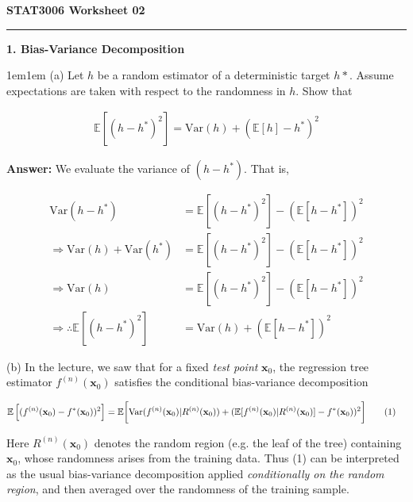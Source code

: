 \documentclass[11pt]{article}
\newcommand\numberthis{\addtocounter{equation}{1}\tag{\theequation}}
\begin{document}
    \begin{center}
        \Large \textbf{STAT3006 Worksheet 02}
    \end{center}

    \rule{\textwidth}{0.3pt}

    \large \textbf{1. Bias-Variance Decomposition}

    \begin{adjustwidth}{1em}{1em}
        (a) Let $h$ be a random estimator of a deterministic target $h*$. Assume expectations are 
        taken with respect to the randomness in $h$. Show that 

        \begin{align*}
            \mathbb{E}[(h - h^*)^2] = \text{Var}(h) + (\mathbb{E}[h] - h^*)^2
        \end{align*}

        \textbf{Answer:} We evaluate the variance of $(h - h^*)$. That is, 

        \begin{align*}
            \text{Var}(h - h^*) &= \mathbb{E}[(h - h^*)^2] - (\mathbb{E}[h - h^*])^2 \\ 
            \Rightarrow \text{Var}(h) + \text{Var}(h^*) &= \mathbb{E}[(h - h^*)^2] - 
            (\mathbb{E}[h - h^*])^2 \\ 
            \Rightarrow \text{Var}(h) &= \mathbb{E}[(h - h^*)^2] - (\mathbb{E}[h - h^*])^2 \\ 
            \Rightarrow \therefore \mathbb{E}[(h - h^*)^2] &= \text{Var}(h) + (\mathbb{E}[h - h^*])
            ^2
        \end{align*}

        (b) In the lecture, we saw that for a fixed \textit{test point} $\mathbf{x}_0$, the 
        regression tree estimator $f^{(n)}(\mathbf{x}_0)$ satisfies the conditional 
        bias-variance decomposition 

        \begin{align*}
            \mathbb{E}\left[(f^{(n)}(\mathbf{x}_0) - f^*(\mathbf{x}_0))^2\right] &= \mathbb{E}
            \bigg[\text{Var}(f^{(n)}(\mathbf{x}_0) | R^{(n)}(\mathbf{x}_0)) +
            (\mathbb{E}[f^{(n)}(\mathbf{x}_0) | R^{(n)}(\mathbf{x}_0)] - f^{*}(\mathbf{x}_0))^2
            \bigg] \numberthis
        \end{align*}

        Here $R^(n)(\mathbf{x}_0)$ denotes the random region (e.g. the leaf of the tree) containing
        $\mathbf{x}_0$, whose randomness arises from the training data. Thus (1) can be interpreted
        as the usual bias-variance decomposition applied \textit{conditionally on the random
        region}, and then averaged over the randomness of the training sample. \\


\end{adjustwidth}
\end{document}
